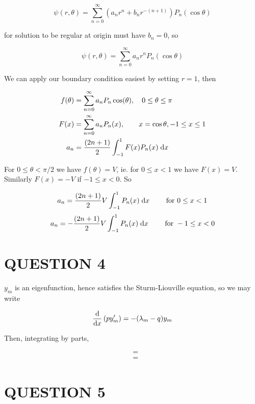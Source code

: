 \documentclass[a4paper]{article}
\begin{document}
\[ \psi (r,\theta) =  \sum_{n=0}^{\infty} (a_{n} r^{n}  + b_{n} r^{-(n+1)}    ) P_{n} (\cos \theta)   \]


for solution to be regular at origin must have $ b_{n} = 0 $, so

\[ \psi (r,\theta) =  \sum_{n=0}^{\infty} a_{n} r^{n} P_{n} (\cos \theta)   \]

We can apply our boundary condition easiest by setting $ r=1 $, then

\begin{align*}
f(\theta) & = \sum_{n=0}^{\infty}  a_{n} P_{n} \cos (\theta), \quad 0 \leq \theta \leq \pi  \\
F(x) & = \sum_{n=0}^{\infty}  a_{n} P_{n} (x), \qquad x = \cos \theta, -1 \leq x \leq 1 \\
a_{n} & = \frac{(2n + 1)}{2} \int_{-1}^{1} F(x) P_{n}(x) \; \mathrm{d} x  
\end{align*}

For $ 0 \leq \theta < \pi / 2 $ we have $ f(\theta) = V $, ie. for $ 0 \leq x <1 $ we have $ F(x) = V $. Similarly $ F(x) = - V $ if $ -1 \leq x < 0  $. So

\[ a_{n} = \frac{(2n + 1)}{2} V \int_{-1}^{1} P_{n}(x) \; \mathrm{d} x \qquad \text{ for } 0 \leq x <1  \]
\[ a_{n} = - \frac{(2n + 1)}{2} V \int_{-1}^{1} P_{n}(x) \; \mathrm{d} x \qquad \text{ for } -1 \leq x <0  \]


\section{QUESTION 4}


$ y_{m} $ is an eigenfunction, hence satisfies the Sturm-Liouville equation, so we may write

\[ \frac{\mathrm{d} }{\mathrm{d} x} \left( p y_{m}' \right) = - ( \lambda_{m} - q)y_{m}     \]

Then, integrating by parts,

\begin{align*}
& = \\
& = 
\end{align*}


\section{QUESTION 5}
\end{document}
